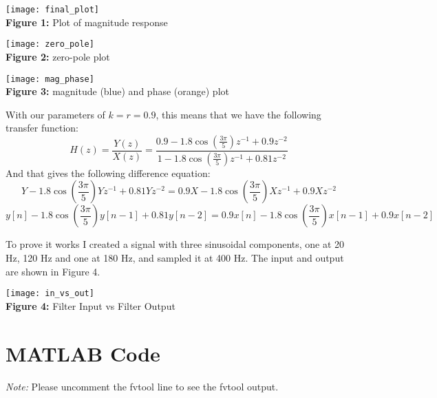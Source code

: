 \documentclass[]{report}
\begin{document}
\begin{center}
\texttt{[image: final\_plot]} \\
\centering
\textbf{Figure 1:} Plot of  magnitude response

\texttt{[image: zero\_pole]} \\
\centering
\textbf{Figure 2:} zero-pole plot

\texttt{[image: mag\_phase]} \\
\centering
\textbf{Figure 3:} magnitude (blue) and phase (orange) plot

\end{center}

With our parameters of $k = r = 0.9$, this means that we have the following transfer function:
	\[	H(z) = \frac{Y(z)}{X(z)} =  \frac{0.9 - 1.8\cos{\left(\frac{3\pi}{5}\right)}z^{-1} + 0.9z^{-2}}{1 -1.8\cos{\left(\frac{3\pi}{5}\right)}z^{-1} + 0.81 z^{-2}}	\]
And that gives the following difference equation:
	\[ 	Y - 1.8\cos{\left(\frac{3\pi}{5}\right)}Yz^{-1} + 0.81Yz^{-2} = 0.9X - 1.8\cos{\left(\frac{3\pi}{5}\right)}Xz^{-1} + 0.9Xz^{-2}	\]
	\[	y[n] -1.8\cos{\left(\frac{3\pi}{5}\right)}y[n-1] + 0.81y[n-2] = 0.9x[n] - 1.8\cos{\left(\frac{3\pi}{5}\right)}x[n-1] + 0.9x[n-2]	\]


To prove it works I created a signal with three sinusoidal components, one at 20 Hz, 120 Hz and one at 180 Hz, and sampled it at 400 Hz. The input and output are shown in Figure 4.

\begin{center}
\texttt{[image: in\_vs\_out]} \\
\centering
\textbf{Figure 4:} Filter Input vs Filter Output
\end{center}

\newpage
\section*{MATLAB Code}
\textit{Note:} Please uncomment the fvtool line to see the fvtool output.
\end{document}
